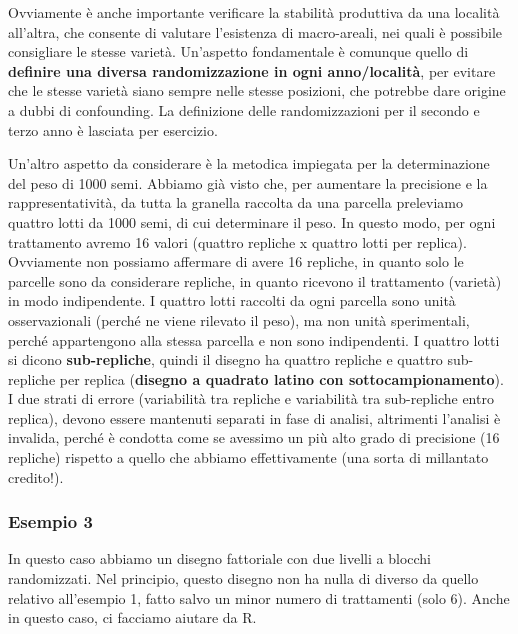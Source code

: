 \documentclass[a4paper,12pt,oneside]{book}
\begin{document}
Ovviamente è anche importante verificare la stabilità produttiva da una
località all'altra, che consente di valutare l'esistenza di
macro-areali, nei quali è possibile consigliare le stesse varietà.
Un'aspetto fondamentale è comunque quello di \textbf{definire una
diversa randomizzazione in ogni anno/località}, per evitare che le
stesse varietà siano sempre nelle stesse posizioni, che potrebbe dare
origine a dubbi di confounding. La definizione delle randomizzazioni per
il secondo e terzo anno è lasciata per esercizio.

Un'altro aspetto da considerare è la metodica impiegata per la
determinazione del peso di 1000 semi. Abbiamo già visto che, per
aumentare la precisione e la rappresentatività, da tutta la granella
raccolta da una parcella preleviamo quattro lotti da 1000 semi, di cui
determinare il peso. In questo modo, per ogni trattamento avremo 16
valori (quattro repliche x quattro lotti per replica). Ovviamente non
possiamo affermare di avere 16 repliche, in quanto solo le parcelle sono
da considerare repliche, in quanto ricevono il trattamento (varietà) in
modo indipendente. I quattro lotti raccolti da ogni parcella sono unità
osservazionali (perché ne viene rilevato il peso), ma non unità
sperimentali, perché appartengono alla stessa parcella e non sono
indipendenti. I quattro lotti si dicono \textbf{sub-repliche}, quindi il
disegno ha quattro repliche e quattro sub-repliche per replica
(\textbf{disegno a quadrato latino con sottocampionamento}). I due
strati di errore (variabilità tra repliche e variabilità tra
sub-repliche entro replica), devono essere mantenuti separati in fase di
analisi, altrimenti l'analisi è invalida, perché è condotta come se
avessimo un più alto grado di precisione (16 repliche) rispetto a quello
che abbiamo effettivamente (una sorta di millantato credito!).

\subsubsection{Esempio 3}\label{esempio-3-1}

In questo caso abbiamo un disegno fattoriale con due livelli a blocchi
randomizzati. Nel principio, questo disegno non ha nulla di diverso da
quello relativo all'esempio 1, fatto salvo un minor numero di
trattamenti (solo 6). Anche in questo caso, ci facciamo aiutare da R.
\end{document}
